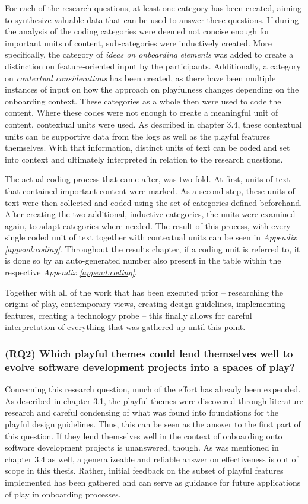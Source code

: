 For each of the research questions, at least one category has been created, aiming to synthesize valuable data that can be used to answer these questions. If during the analysis of the coding categories were deemed not concise enough for important units of content, sub-categories were inductively created. More specifically, the category of \textit{ideas on onboarding elements} was added to create a distinction on feature-oriented input by the participants. Additionally, a category on \textit{contextual considerations} has been created, as there have been multiple instances of input on how the approach on playfulness changes depending on the onboarding context. These categories as a whole then were used to code the content. Where these codes were not enough to create a meaningful unit of content, contextual units were used. As described in chapter 3.4, these contextual units can be supportive data from the logs as well as the playful features themselves. With that information, distinct units of text can be coded and set into context and ultimately interpreted in relation to the research questions.

The actual coding process that came after, was two-fold. At first, units of text that contained important content were marked. As a second step, these units of text were then collected and coded using the set of categories defined beforehand. After creating the two additional, inductive categories, the units were examined again, to adapt categories where needed. The result of this process, with every single coded unit of text together with contextual units can be seen in \textit{Appendix \ref{append:coding}}. Throughout the results chapter, if a coding unit is referred to, it is done so by an auto-generated number also present in the table within the respective \textit{Appendix \ref{append:coding}}.

Together with all of the work that has been executed prior -- researching the origins of play, contemporary views, creating design guidelines, implementing features, creating a technology probe -- this finally allows for careful interpretation of everything that was gathered up until this point.

\subsubsection*{(RQ2) Which playful themes could lend themselves well to evolve software development projects into a spaces of play?}

Concerning this research question, much of the effort has already been expended. As described in chapter 3.1, the playful themes were discovered through literature research and careful condensing of what was found into foundations for the playful design guidelines. Thus, this can be seen as the answer to the first part of this question. If they lend themselves well in the context of onboarding onto software development projects is unanswered, though. As was mentioned in chapter 3.4 as well, a generalizeable and reliable answer on effectiveness is out of scope in this thesis. Rather, initial feedback on the subset of playful features implemented has been gathered and can serve as guidance for future applications of play in onboarding processes.

